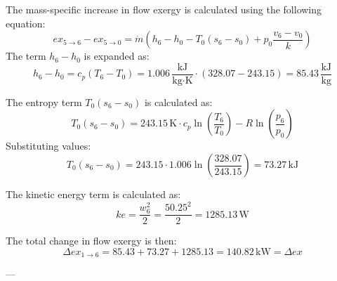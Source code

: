 The mass-specific increase in flow exergy is calculated using the following equation:  
\[
ex_{5 \to 6} - ex_{5 \to 0} = \dot{m} \left( h_6 - h_0 - T_0 (s_6 - s_0) + p_0 \frac{v_6 - v_0}{k} \right)
\]  
The term \( h_6 - h_0 \) is expanded as:  
\[
h_6 - h_0 = c_p \left( T_6 - T_0 \right) = 1.006 \, \frac{\text{kJ}}{\text{kg·K}} \cdot (328.07 - 243.15) = 85.43 \, \frac{\text{kJ}}{\text{kg}}
\]  

The entropy term \( T_0 (s_6 - s_0) \) is calculated as:  
\[
T_0 (s_6 - s_0) = 243.15 \, \text{K} \cdot c_p \ln \left( \frac{T_6}{T_0} \right) - R \ln \left( \frac{p_6}{p_0} \right)
\]  
Substituting values:  
\[
T_0 (s_6 - s_0) = 243.15 \cdot 1.006 \ln \left( \frac{328.07}{243.15} \right) = 73.27 \, \text{kJ}
\]  

The kinetic energy term is calculated as:  
\[
ke = \frac{w_6^2}{2} = \frac{50.25^2}{2} = 1285.13 \, \text{W}
\]  

The total change in flow exergy is then:  
\[
\Delta ex_{1 \to 6} = 85.43 + 73.27 + 1285.13 = 140.82 \, \text{kW} = \Delta ex
\]  

---